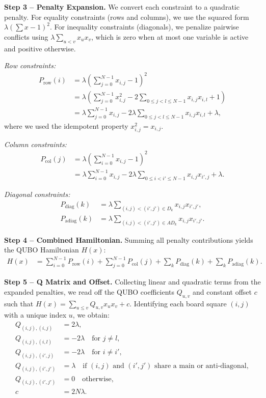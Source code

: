 \documentclass[12pt]{article}
\begin{document}
\textbf{Step 3 -- Penalty Expansion.}
We convert each constraint to a quadratic penalty. For equality constraints (rows and columns), we use the squared form $\lambda(\sum x - 1)^2$. For inequality constraints (diagonals), we penalize pairwise conflicts using $\lambda \sum_{u<v} x_u x_v$, which is zero when at most one variable is active and positive otherwise.

\textit{Row constraints:}
\begin{align}
P_{\text{row}}(i) &= \lambda \left( \sum_{j=0}^{N-1} x_{i,j} - 1 \right)^2 \\
&= \lambda \left( \sum_{j=0}^{N-1} x_{i,j}^2 - 2 \sum_{0 \le j < l \le N-1} x_{i,j}x_{i,l} + 1 \right) \\
&= \lambda \sum_{j=0}^{N-1} x_{i,j} - 2\lambda \sum_{0 \le j < l \le N-1} x_{i,j}x_{i,l} + \lambda,
\end{align}
where we used the idempotent property $x_{i,j}^2 = x_{i,j}$.

\textit{Column constraints:}
\begin{align}
P_{\text{col}}(j) &= \lambda \left( \sum_{i=0}^{N-1} x_{i,j} - 1 \right)^2 \\
&= \lambda \sum_{i=0}^{N-1} x_{i,j} - 2\lambda \sum_{0 \le i < i' \le N-1} x_{i,j}x_{i',j} + \lambda.
\end{align}

\textit{Diagonal constraints:}
\begin{align}
P_{\text{diag}}(k) &= \lambda \sum_{(i,j) < (i',j') \in D_k} x_{i,j}x_{i',j'}, \\
P_{\text{adiag}}(k) &= \lambda \sum_{(i,j) < (i',j') \in AD_k} x_{i,j}x_{i',j'}.
\end{align}

\textbf{Step 4 -- Combined Hamiltonian.}
Summing all penalty contributions yields the QUBO Hamiltonian $H(x)$:
\begin{align}
H(x) &= \sum_{i=0}^{N-1} P_{\text{row}}(i) + \sum_{j=0}^{N-1} P_{\text{col}}(j) + \sum_{k} P_{\text{diag}}(k) + \sum_{k} P_{\text{adiag}}(k).
\end{align}

\textbf{Step 5 -- Q Matrix and Offset.}
Collecting linear and quadratic terms from the expanded penalties, we read off the QUBO coefficients $Q_{u,v}$ and constant offset $c$ such that $H(x) = \sum_{u \le v} Q_{u,v} x_u x_v + c$. Identifying each board square $(i,j)$ with a unique index $u$, we obtain:
\begin{align}
Q_{(i,j),(i,j)} &= 2\lambda, \\
Q_{(i,j),(i,l)} &= -2\lambda \quad \text{for } j \neq l, \\
Q_{(i,j),(i',j)} &= -2\lambda \quad \text{for } i \neq i', \\
Q_{(i,j),(i',j')} &= \lambda \quad \text{if } (i,j) \text{ and } (i',j') \text{ share a main or anti-diagonal}, \\
Q_{(i,j),(i',j')} &= 0 \quad \text{otherwise}, \\
c &= 2N\lambda.
\end{align}
\end{document}
